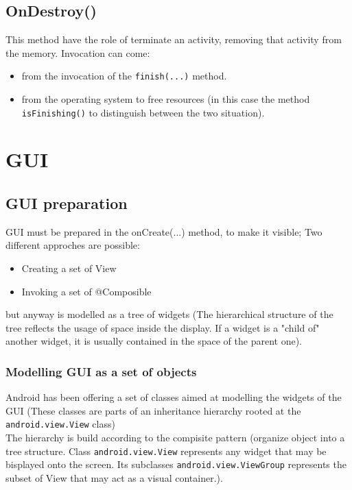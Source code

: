 \documentclass[12pt]{article}
\begin{document}
\subsection{OnDestroy()}
This method have the role of  terminate an activity, removing that activity from the memory. Invocation can come:
\begin{itemize}
	\item from the invocation of the \verb|finish(...)| method.
	\item from the operating system to free resources (in this case the method \verb|isFinishing()| to distinguish between the two situation).
\end{itemize}


\section{GUI}
\subsection{GUI preparation}
GUI must be prepared in the onCreate(...) method, to make it visible;
Two different approches are possible:
\begin{itemize}
	\item	Creating a set of View
	\item	Invoking a set of @Composible
\end{itemize}
but anyway is modelled as a tree of widgets (The hierarchical structure of the tree reflects the usage of space inside the display. If a widget is a "child of" another widget, it is usually contained in the space of the parent one).
\subsubsection{Modelling GUI as a set of objects}
Android has been offering a set of classes aimed at modelling the widgets of the GUI (These classes are parts  of an inheritance hierarchy rooted at the \verb|android.view.View| class)\\
The hierarchy is build according to the compisite pattern (organize object into a tree structure. Class \verb|android.view.View| represents any widget that may be bisplayed onto the screen. Its subclasses \verb|android.view.ViewGroup| represents the subset of View that may act as a visual container.).\\
\end{document}
